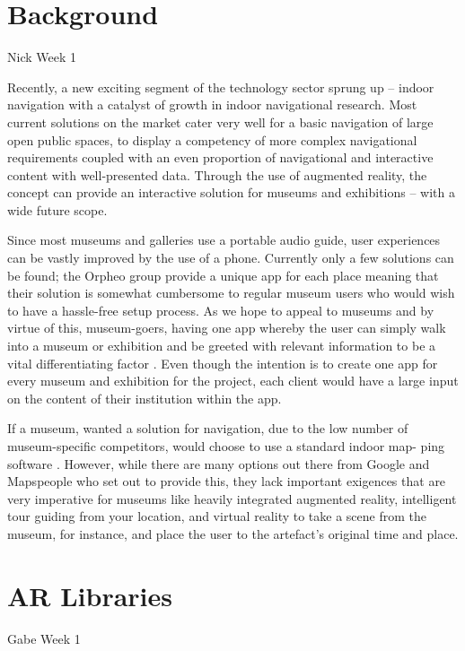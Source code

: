 \section{Background}
Nick Week 1

Recently, a new exciting  segment of the technology sector  sprung up – indoor navigation with a catalyst of growth in indoor navigational research. Most current solutions on the market cater very well for a basic navigation of large open public spaces,  to display a competency of more complex navigational requirements coupled with an even proportion of navigational and interactive content with well-presented data. Through the use of augmented reality, the concept can provide an interactive  solution for museums and exhibitions – with a wide future scope. 

Since most museums and galleries use a portable audio guide, user experiences can be vastly improved by the use of a phone. Currently only a few solutions can be found; the Orpheo group \cite{orpheo} provide a unique app for each place meaning that their solution is somewhat cumbersome to regular museum users who would wish to have a hassle-free setup process. As we hope to appeal to museums and by virtue of this, museum-goers, having one app whereby the user can simply walk into a museum or exhibition and be greeted with relevant information to be a vital differentiating factor \cite{microsoft}. Even though the intention is to create one app for every museum and exhibition for the project, each client would have a large input on the content of their institution within the app. 

If a museum, wanted a solution for navigation, due to the low number of museum-specific competitors, would choose to use a standard indoor map- ping software \cite{murphy}. However, while there are many options out there from Google and Mapspeople \cite{mapspeople} who set out to provide this, they lack important exigences that are very imperative for museums like heavily integrated augmented reality, intelligent tour guiding from your location, and virtual reality to take a scene from the museum, for instance, and place the user to the artefact’s original time and place. 

\section{AR Libraries}
Gabe Week 1


